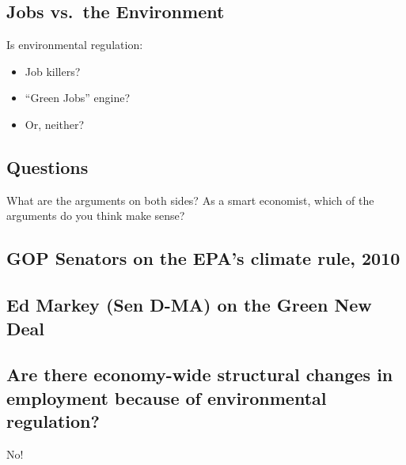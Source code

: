 \documentclass[
]{article}
\providecommand{\tightlist}{%
  \setlength{\itemsep}{0pt}\setlength{\parskip}{0pt}}
\begin{document}
\hypertarget{jobs-vs.-the-environment}{%
\subsection{Jobs vs.~the Environment}\label{jobs-vs.-the-environment}}

Is environmental regulation:

\begin{itemize}
\tightlist
\item
  Job killers?
\item
  ``Green Jobs'' engine?
\item
  Or, neither?
\end{itemize}

\hypertarget{questions}{%
\subsection{Questions}\label{questions}}

What are the arguments on both sides? As a smart economist, which of the
arguments do you think make sense?

\hypertarget{gop-senators-on-the-epas-climate-rule-2010}{%
\subsection{GOP Senators on the EPA's climate rule,
2010}\label{gop-senators-on-the-epas-climate-rule-2010}}

\hypertarget{ed-markey-sen-d-ma-on-the-green-new-deal}{%
\subsection{Ed Markey (Sen D-MA) on the Green New
Deal}\label{ed-markey-sen-d-ma-on-the-green-new-deal}}

\hypertarget{are-there-economy-wide-structural-changes-in-employment-because-of-environmental-regulation}{%
\subsection{Are there economy-wide structural changes in employment
because of environmental
regulation?}\label{are-there-economy-wide-structural-changes-in-employment-because-of-environmental-regulation}}

No!
\end{document}

